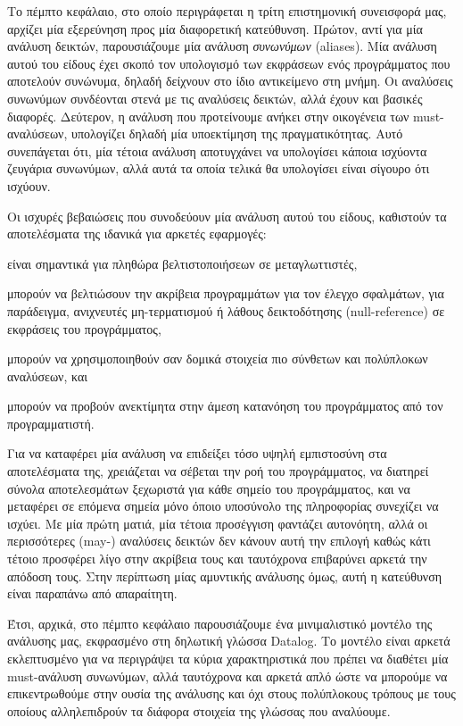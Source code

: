 Το πέμπτο κεφάλαιο, στο οποίο περιγράφεται η τρίτη επιστημονική συνεισφορά μας, αρχίζει μία εξερεύνηση προς μία διαφορετική κατεύθυνση. Πρώτον, αντί για μία ανάλυση δεικτών, παρουσιάζουμε μία ανάλυση \emph{συνωνύμων} ({\en aliases}). Μία ανάλυση αυτού του είδους έχει σκοπό τον υπολογισμό των εκφράσεων ενός προγράμματος που αποτελούν συνώνυμα, δηλαδή δείχνουν στο ίδιο αντικείμενο στη μνήμη. Οι αναλύσεις συνωνύμων συνδέονται στενά με τις αναλύσεις δεικτών, αλλά έχουν και βασικές διαφορές. Δεύτερον, η ανάλυση που προτείνουμε ανήκει στην οικογένεια των {\en must-}αναλύσεων, υπολογίζει δηλαδή μία υποεκτίμηση της πραγματικότητας. Αυτό συνεπάγεται ότι, μία τέτοια ανάλυση αποτυγχάνει να υπολογίσει κάποια ισχύοντα ζευγάρια συνωνύμων, αλλά αυτά τα οποία τελικά θα υπολογίσει είναι σίγουρο ότι ισχύουν.

Οι ισχυρές βεβαιώσεις που συνοδεύουν μία ανάλυση αυτού του είδους, καθιστούν τα αποτελέσματα της ιδανικά για αρκετές εφαρμογές:
\begin{inparaenum}[(1)]
\item είναι σημαντικά για πληθώρα βελτιστοποιήσεων σε μεταγλωττιστές,
\item μπορούν να βελτιώσουν την ακρίβεια προγραμμάτων για τον έλεγχο σφαλμάτων, για παράδειγμα, ανιχνευτές μη-τερματισμού ή λάθους δεικτοδότησης ({\en null-reference}) σε εκφράσεις του προγράμματος,
\item μπορούν να χρησιμοποιηθούν σαν δομικά στοιχεία πιο σύνθετων και πολύπλοκων αναλύσεων, και
\item μπορούν να προβούν ανεκτίμητα στην άμεση κατανόηση του προγράμματος από τον προγραμματιστή.
\end{inparaenum}

Για να καταφέρει μία ανάλυση να επιδείξει τόσο υψηλή εμπιστοσύνη στα αποτελέσματα της, χρειάζεται να σέβεται την ροή του προγράμματος, να διατηρεί σύνολα αποτελεσμάτων ξεχωριστά για κάθε σημείο του προγράμματος, και να μεταφέρει σε επόμενα σημεία μόνο όποιο υποσύνολο της πληροφορίας συνεχίζει να ισχύει. Με μία πρώτη ματιά, μία τέτοια προσέγγιση φαντάζει αυτονόητη, αλλά οι περισσότερες ({\en may}-) αναλύσεις δεικτών δεν κάνουν αυτή την επιλογή καθώς κάτι τέτοιο προσφέρει λίγο στην ακρίβεια τους και ταυτόχρονα επιβαρύνει αρκετά την απόδοση τους. Στην περίπτωση μίας αμυντικής ανάλυσης όμως, αυτή η κατεύθυνση είναι παραπάνω από απαραίτητη.

Έτσι, αρχικά, στο πέμπτο κεφάλαιο παρουσιάζουμε ένα μινιμαλιστικό μοντέλο της ανάλυσης μας, εκφρασμένο στη δηλωτική γλώσσα {\en Datalog}. Το μοντέλο είναι αρκετά εκλεπτυσμένο για να περιγράψει τα κύρια χαρακτηριστικά που πρέπει να διαθέτει μία {\en must-}ανάλυση συνωνύμων, αλλά ταυτόχρονα και αρκετά απλό ώστε να μπορούμε να επικεντρωθούμε στην ουσία της ανάλυσης και όχι στους πολύπλοκους τρόπους με τους οποίους αλληλεπιδρούν τα διάφορα στοιχεία της γλώσσας που αναλύουμε.

